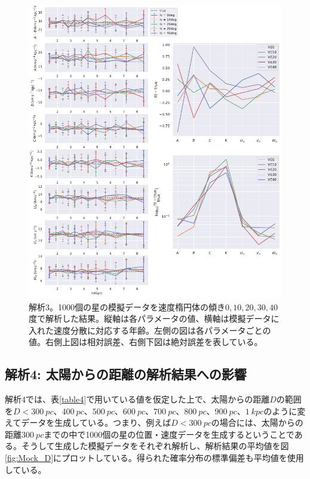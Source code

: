 \begin{figure}[htbp]
	\centering
	\includegraphics[width=15cm]{fig/Mock_VE.pdf}
	\caption{解析3。1000個の星の模擬データを速度楕円体の傾き$0,10,20,30,40$度で解析した結果。縦軸は各パラメータの値、横軸は模擬データに入れた速度分散に対応する年齢。左側の図は各パラメータごとの値。右側上図は相対誤差、右側下図は絶対誤差を表している。} \label{fig:Mock_VE}
\end{figure}



\subsection{解析4: 太陽からの距離の解析結果への影響}
解析4では、表\ref{table4}で用いている値を仮定した上で、太陽からの距離$D$の範囲を$D<\SI{300}{pc}、\SI{400}{pc}、\SI{500}{pc}、\SI{600}{pc}、\SI{700}{pc}、\SI{800}{pc}、\SI{900}{pc}、\SI{1}{kpc}$のように変えてデータを生成している。つまり、例えば$D<\SI{300}{pc}$の場合には、太陽からの距離$\SI{300}{pc}$までの中で1000個の星の位置・速度データを生成するということである。そうして生成した模擬データをそれぞれ解析し、解析結果の平均値を図\ref{fig:Mock_D}にプロットしている。得られた確率分布の標準偏差も平均値を使用している。


